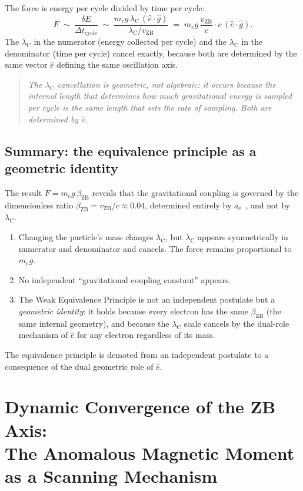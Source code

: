 \documentclass[%
 reprint, amsmath,amssymb, aps, prb, ]{revtex4-2}
\numberwithin{equation}{section}
\newcommand{\lambdaC}{\lambda_{\mathrm{C}}}
\newcommand{\betaZB}{\beta_{\mathrm{ZB}}}
\newcommand{\vZB}{v_{\mathrm{ZB}}}
\newcommand{\anom}{a_{\mathrm{e}}}
\begin{document}
The force is energy per cycle divided by time per cycle:
\begin{equation}
F \;\sim\; \frac{\delta E}{\Delta t_\mathrm{cycle}} \;\sim\; \frac{m_e g\,\lambdaC\,(\hat{e}\cdot\hat{g})}{\lambdaC/\vZB} \;=\; m_e g\,\frac{\vZB}{c}\cdot c\,(\hat{e}\cdot\hat{g}).
\label{eq:F_app}
\end{equation}
The $\lambdaC$ in the numerator (energy collected per cycle) and the $\lambdaC$ in the denominator (time per cycle) cancel exactly, because both are determined by the same vector $\hat{e}$ defining the same oscillation axis.

\begin{quote}
\textit{The $\lambdaC$ cancellation is geometric, not algebraic: it occurs because the internal length that determines how much gravitational energy is sampled per cycle is the same length that sets the rate of sampling. Both are determined by $\hat{e}$.}
\end{quote}

\subsection{Summary: the equivalence principle as a geometric identity}

The result $F = m_e g\,\betaZB$ reveals that the gravitational coupling is governed by the dimensionless ratio $\betaZB = \vZB/c \approx 0.04$, determined entirely by $\anom$~\cite{hanamura10}, and not by $\lambdaC$.
\begin{enumerate}[label=(\roman*), leftmargin=2em]
\item Changing the particle's mass changes $\lambdaC$, but $\lambdaC$ appears symmetrically in numerator and denominator and cancels. The force remains proportional to $m_e g$.
\item No independent ``gravitational coupling constant'' appears.
\item The Weak Equivalence Principle is not an independent postulate but a \emph{geometric identity}: it holds because every electron has the same $\betaZB$ (the same internal geometry), and because the $\lambdaC$ scale cancels by the dual-role mechanism of $\hat{e}$ for any electron regardless of its mass.
\end{enumerate}
The equivalence principle is demoted from an independent postulate to a consequence of the dual geometric role of $\hat{e}$.

\section{Dynamic Convergence of the ZB Axis:\\
         The Anomalous Magnetic Moment as a Scanning Mechanism}
\label{app:dynamic_convergence}
\end{document}
